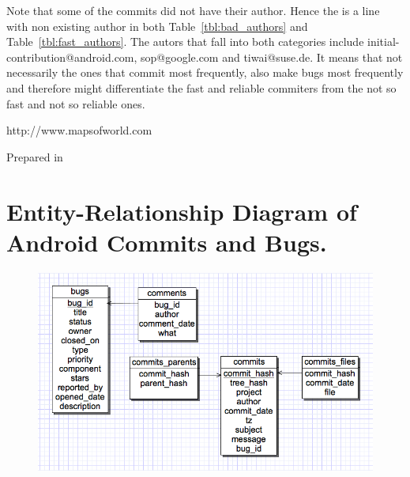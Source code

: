 \documentclass[a4paper,11pt]{article}
\begin{document}
Note that some of the commits did not have their author. Hence the is a line with non existing author in both Table~\ref{tbl:bad_authors} and Table~\ref{tbl:fast_authors}. The autors that fall into both categories include initial-contribution@android.com, sop@google.com and tiwai@suse.de. It means that not necessarily the ones that commit most frequently, also make bugs most frequently and therefore might differentiate the fast and reliable commiters from the not so fast and not so reliable ones.


\begin{thebibliography}{9999}%
 http://www.mapsofworld.com
\end{thebibliography}
\vfill
\begin{flushright}\small Prepared in \LaTeXe\ \end{flushright}

\appendix
\section{Entity-Relationship Diagram of Android Commits and Bugs.}
\begin{figure}[ht!]
\centering
\includegraphics[width=1.2\textwidth]{../diagrams/er_diagram.png}
\label{fig:er_diagram}
\end{figure}

\end{document}

